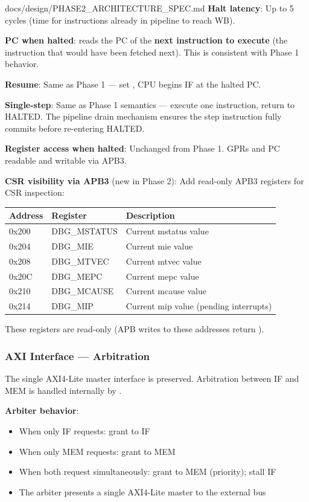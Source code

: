 \begin{relocated}{docs/design/PHASE2_ARCHITECTURE_SPEC.md}
\textbf{Halt latency}: Up to 5 cycles (time for instructions already in
pipeline to reach WB).

\textbf{PC when halted}:  reads the PC of the \textbf{next
instruction to execute} (the instruction that would have been fetched
next). This is consistent with Phase 1 behavior.

\textbf{Resume}: Same as Phase 1 --- set , CPU begins
IF at the halted PC.

\textbf{Single-step}: Same as Phase 1 semantics --- execute one
instruction, return to HALTED. The pipeline drain mechanism ensures the
step instruction fully commits before re-entering HALTED.

\textbf{Register access when halted}: Unchanged from Phase 1. GPRs and
PC readable and writable via APB3.

\textbf{CSR visibility via APB3} (new in Phase 2): Add read-only APB3
registers for CSR inspection:

{
\begin{longtable}[]{@{}lll@{}}
\toprule\noalign{}
Address & Register & Description \\
\midrule\noalign{}
\endhead
\bottomrule\noalign{}
\endlastfoot
0x200 & DBG\_\allowbreak{}MSTATUS & Current mstatus value \\
0x204 & DBG\_MIE & Current mie value \\
0x208 & DBG\_MTVEC & Current mtvec value \\
0x20C & DBG\_MEPC & Current mepc value \\
0x210 & DBG\_\allowbreak{}MCAUSE & Current mcause value \\
0x214 & DBG\_MIP & Current mip value (pending interrupts) \\
\end{longtable}
}

These registers are read-only (APB writes to these addresses return
).

\subsubsection{AXI Interface --- Arbitration}\label{ds:ch:phase2-architecture:64-axi-interface-arbitration}

The single AXI4-Lite master interface is preserved. Arbitration between
IF and MEM is handled internally by .

\textbf{Arbiter behavior}:

\begin{itemize}
\tightlist
\item
  When only IF requests: grant to IF
\item
  When only MEM requests: grant to MEM
\item
  When both request simultaneously: grant to MEM (priority); stall IF
\item
  The arbiter presents a single AXI4-Lite master to the external bus
\end{itemize}


\end{relocated}
